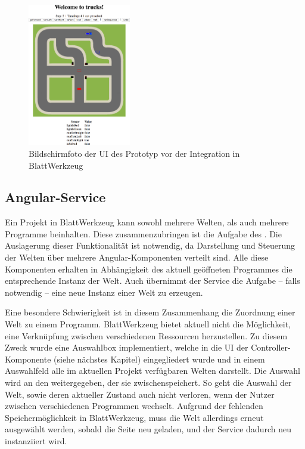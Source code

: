\begin{figure}
  \centering
  \includegraphics[width=0.4\textwidth]{gfx/implementation-integration-prototype.png}
  \caption{Bildschirmfoto der UI des Prototyp vor der Integration in BlattWerkzeug}
  \label{fig:implementation:integration:prototype}
\end{figure}

\subsection{Angular-Service}
\label{sec:implementation:integration:ng-service}

Ein Projekt in BlattWerkzeug kann sowohl mehrere Welten, als auch mehrere Programme beinhalten. Diese zusammenzubringen ist die Aufgabe des . Die Auslagerung dieser Funktionalität ist notwendig, da Darstellung und Steuerung der Welten über mehrere Angular-Kom\-po\-nen\-ten verteilt sind. Alle diese Komponenten erhalten in Abhängigkeit des aktuell geöffneten Programmes die entsprechende Instanz der Welt. Auch übernimmt der Service die Aufgabe -- falls notwendig -- eine neue Instanz einer Welt zu erzeugen.

Eine besondere Schwierigkeit ist in diesem Zusammenhang die Zuordnung einer Welt zu einem Programm. BlattWerkzeug bietet aktuell nicht die Möglichkeit, eine Verknüpfung zwischen verschiedenen Ressourcen herzustellen. Zu diesem Zweck wurde eine Auswahlbox implementiert, welche in die UI der Controller-Kom\-po\-nen\-te (siehe nächstes Kapitel) eingegliedert wurde und in einem Auswahlfeld alle im aktuellen Projekt verfügbaren Welten darstellt. Die Auswahl wird an den  weitergegeben, der sie zwischenspeichert. So geht die Auswahl der Welt, sowie deren aktueller Zustand auch nicht verloren, wenn der Nutzer zwischen verschiedenen Programmen wechselt. Aufgrund der fehlenden Speichermöglichkeit in BlattWerkzeug, muss die Welt allerdings erneut ausgewählt werden, sobald die Seite neu geladen, und der Service dadurch neu instanziiert wird.

